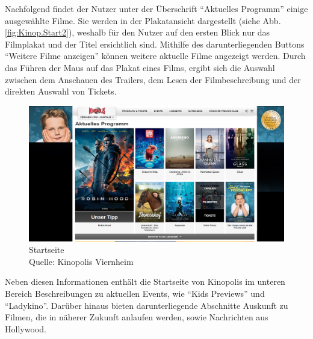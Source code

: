 	Nachfolgend findet der Nutzer unter der Überschrift \enquote{Aktuelles Programm} einige ausgewählte Filme. Sie werden in der Plakatansicht dargestellt (siehe Abb. \vref{fig:Kinop.Start2}), weshalb für den Nutzer auf den ersten Blick nur das Filmplakat und der Titel ersichtlich sind. Mithilfe des darunterliegenden Buttons \enquote{Weitere Filme anzeigen} können weitere aktuelle Filme angezeigt werden. Durch das Führen der Maus auf das Plakat eines Films, ergibt sich die Auswahl zwischen dem Anschauen des Trailers, dem Lesen der Filmbeschreibung und der direkten Auswahl von Tickets.
	\begin{figure}
		\centering 
		\includegraphics[width=14cm]{img/Kinopolis_MA_Start2.png}
		\captionsetup{format=hang}
		\centering\caption[Startseite von Kinopolis Viernheim]{\label{fig:Kinop.Start2}Startseite \\Quelle: Kinopolis Viernheim}
	\end{figure}
	
	Neben diesen Informationen enthält die Startseite von Kinopolis im unteren Bereich Beschreibungen zu aktuellen Events, wie \enquote{Kids Previews} und \enquote{Ladykino}. Darüber hinaus bieten darunterliegende Abschnitte Auskunft zu Filmen, die in näherer Zukunft anlaufen werden, sowie Nachrichten aus Hollywood. 
	
